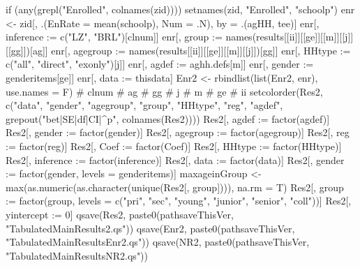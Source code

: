 \begin{Schunk}
\begin{Sinput}
{{{{{{{                if (any(grepl("Enrolled", colnames(zid)))) setnames(zid, "Enrolled", "schoolp")
                enr <- zid[, .(EnRate = mean(schoolp), Num = .N), by = .(agHH, tee)]
                enr[, inference := c("LZ", "BRL")[clnum]]
                enr[, group := names(results[[ii]][[ge]][[m]][[j]][[gg]])[ag]]
                enr[, agegroup := names(results[[ii]][[ge]][[m]][[j]])[gg]]
                enr[, HHtype := c("all", "direct", "exonly")[j]]
                enr[, agdef := aghh.defs[m]]
                enr[, gender := genderitems[ge]]
                enr[, data := thisdata]
                Enr2 <- rbindlist(list(Enr2, enr), use.names = F)
              } # clnum
            } # ag
          } # gg
        } # j
      } # m
    } # ge
} # ii
setcolorder(Res2, c("data", "gender", "agegroup", "group",  "HHtype", "reg", "agdef",
  grepout("bet|SE|df|CI|^p", colnames(Res2))))
Res2[, agdef := factor(agdef)]
Res2[, gender := factor(gender)]
Res2[, agegroup := factor(agegroup)]
Res2[, reg := factor(reg)]
Res2[, Coef := factor(Coef)]
Res2[, HHtype := factor(HHtype)]
Res2[, inference := factor(inference)]
Res2[, data := factor(data)]
Res2[, gender := factor(gender, levels = genderitems)]
maxageinGroup <- max(as.numeric(as.character(unique(Res2[, group]))), na.rm = T)
Res2[, group := factor(group, levels = c("pri", "sec", "young", "junior", "senior", "coll"))]
Res2[, yintercept := 0]
qsave(Res2, paste0(pathsaveThisVer, "TabulatedMainResults2.qs"))
qsave(Enr2, paste0(pathsaveThisVer, "TabulatedMainResultsEnr2.qs"))
qsave(NR2, paste0(pathsaveThisVer, "TabulatedMainResultsNR2.qs"))
\end{Sinput}
\end{Schunk}
